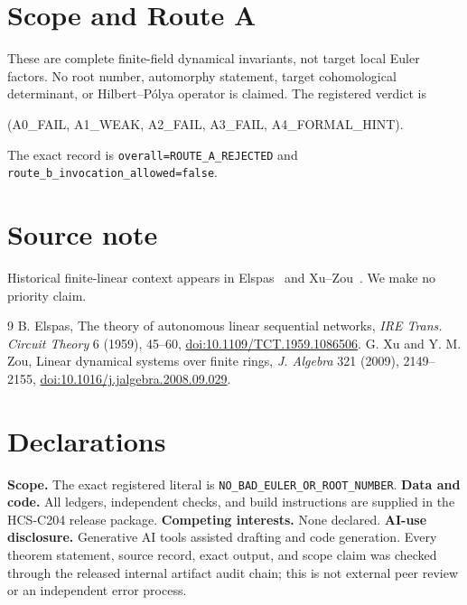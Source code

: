 \documentclass[11pt]{article}
\begin{document}
\section{Scope and Route A}
These are complete finite-field dynamical invariants, not target local Euler
factors.  No root number, automorphy statement, target cohomological
determinant, or Hilbert--P\'olya operator is claimed.  The registered verdict is
\begin{center}\small\ttfamily
(A0\_FAIL, A1\_WEAK, A2\_FAIL, A3\_FAIL, A4\_FORMAL\_HINT).
\end{center}
The exact record is \texttt{overall=ROUTE\_A\_REJECTED} and
\texttt{route\_b\_invocation\_allowed=false}.
\fi

\section*{Source note}
Historical finite-linear context appears in Elspas~\cite{elspas1959} and
Xu--Zou~\cite{xuzou2009}.  We make no priority claim.
\begin{thebibliography}{9}
 B. Elspas, The theory of autonomous linear sequential
networks, \emph{IRE Trans. Circuit Theory} 6 (1959), 45--60,
\href{https://doi.org/10.1109/TCT.1959.1086506}{doi:10.1109/TCT.1959.1086506}.
 G. Xu and Y. M. Zou, Linear dynamical systems over finite
rings, \emph{J. Algebra} 321 (2009), 2149--2155,
\href{https://doi.org/10.1016/j.jalgebra.2008.09.029}{doi:10.1016/j.jalgebra.2008.09.029}.
\end{thebibliography}
\section*{Declarations}
\textbf{Scope.} The exact registered literal is
\texttt{NO\_BAD\_EULER\_OR\_ROOT\_NUMBER}.
\textbf{Data and code.} All ledgers, independent checks, and build instructions
are supplied in the HCS-C204 release package.
\textbf{Competing interests.} None declared.
\textbf{AI-use disclosure.} Generative AI tools assisted drafting and code
generation.  Every theorem statement, source record, exact output, and scope
claim was checked through the released internal artifact audit chain; this is
not external peer review or an independent error process.
\end{document}

